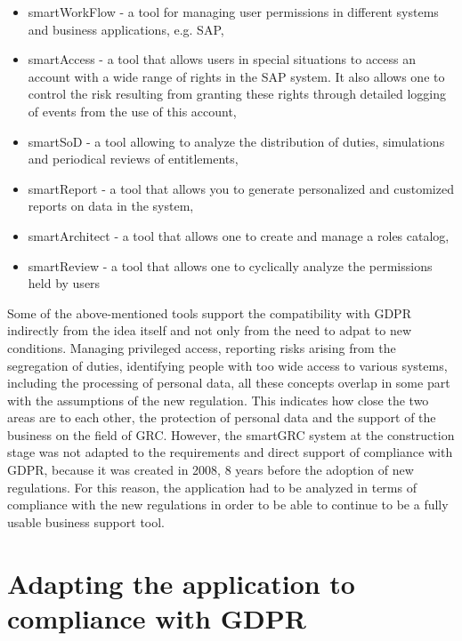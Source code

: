 \documentclass[en, noamssymb]{mgr}
\begin{document}
\begin{itemize}

\item smartWorkFlow - a tool for managing user permissions in different systems and business applications, e.g. SAP,

\item smartAccess - a tool that allows users in special situations to access an account with a wide range of rights in the SAP system. It also allows one to control the risk resulting from granting these rights through detailed logging of events from the use of this account,

\item smartSoD - a tool allowing to analyze the distribution of duties, simulations and periodical reviews of entitlements,

\item smartReport - a tool that allows you to generate personalized and customized reports on data in the system,

\item smartArchitect - a tool that allows one to create and manage a roles catalog,

\item smartReview - a tool that allows one to cyclically analyze the permissions held by users

\end{itemize}

Some of the above-mentioned tools support the compatibility with GDPR indirectly from the idea itself and not only from the need to adpat to new conditions. Managing privileged access, reporting risks arising from the segregation of duties, identifying people with too wide access to various systems, including the processing of personal data, all these concepts overlap in some part with the assumptions of the new regulation. This indicates how close the two areas are to each other, the protection of personal data and the support of the business on the field of GRC. However, the smartGRC system at the construction stage was not adapted to the requirements and direct support of compliance with GDPR, because it was created in 2008, 8 years before the adoption of new regulations. For this reason, the application had to be analyzed in terms of compliance with the new regulations in order to be able to continue to be a fully usable business support tool.

\section{Adapting the application to compliance with GDPR}
\end{document}
